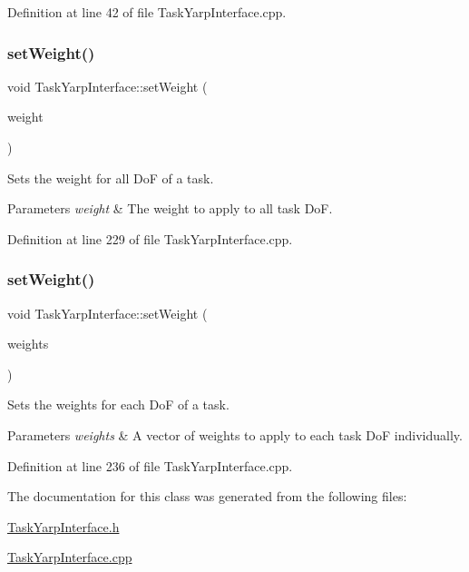 Definition at line 42 of file Task\+Yarp\+Interface.\+cpp.

\hypertarget{classocra_1_1TaskYarpInterface_aa66137afb92c94c1c261c067444b2f2d}{}\label{classocra_1_1TaskYarpInterface_aa66137afb92c94c1c261c067444b2f2d} 
\subsubsection{\texorpdfstring{set\+Weight()}{setWeight()}\hspace{0.1cm}{\footnotesize\ttfamily [1/2]}}
{\footnotesize\ttfamily void Task\+Yarp\+Interface\+::set\+Weight (\begin{DoxyParamCaption}\item[{double}]{weight }\end{DoxyParamCaption})}

Sets the weight for all DoF of a task. 
\begin{DoxyParams}{Parameters}
{\em weight} & The weight to apply to all task DoF. \\
\hline
\end{DoxyParams}


Definition at line 229 of file Task\+Yarp\+Interface.\+cpp.

\hypertarget{classocra_1_1TaskYarpInterface_a06929d4d2480cd39dbcf0ef9f04fd849}{}\label{classocra_1_1TaskYarpInterface_a06929d4d2480cd39dbcf0ef9f04fd849} 
\subsubsection{\texorpdfstring{set\+Weight()}{setWeight()}\hspace{0.1cm}{\footnotesize\ttfamily [2/2]}}
{\footnotesize\ttfamily void Task\+Yarp\+Interface\+::set\+Weight (\begin{DoxyParamCaption}\item[{const Eigen\+::\+Vector\+Xd \&}]{weights }\end{DoxyParamCaption})}

Sets the weights for each DoF of a task. 
\begin{DoxyParams}{Parameters}
{\em weights} & A vector of weights to apply to each task DoF individually. \\
\hline
\end{DoxyParams}


Definition at line 236 of file Task\+Yarp\+Interface.\+cpp.



The documentation for this class was generated from the following files\+:\begin{DoxyCompactItemize}
\item 
\hyperlink{TaskYarpInterface_8h}{Task\+Yarp\+Interface.\+h}\item 
\hyperlink{TaskYarpInterface_8cpp}{Task\+Yarp\+Interface.\+cpp}\end{DoxyCompactItemize}
